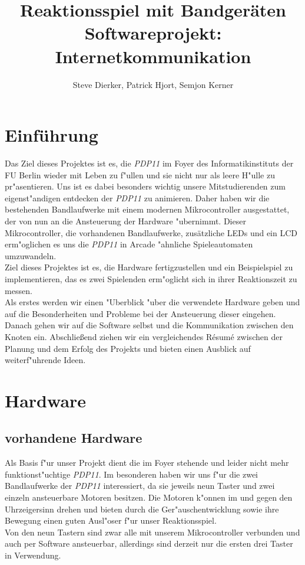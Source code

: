 \documentclass[a4paper]{article}
\title{%
  Reaktionsspiel mit Bandgeräten \\
  \large Softwareprojekt: Internetkommunikation}
\author{Steve Dierker, Patrick Hjort, Semjon Kerner}
\begin{document}
\maketitle

\section{Einführung}
  \label{sec:intro}
  Das Ziel dieses Projektes ist es, die \textit{PDP11} im Foyer des
  Informatikinstituts der FU Berlin wieder mit Leben zu f"ullen und sie nicht
  nur als leere H"ulle zu pr"asentieren. Uns ist es dabei besonders wichtig
  unsere Mitstudierenden zum eigenst"andigen entdecken der \textit{PDP11} zu
  animieren.  Daher haben wir die bestehenden Bandlaufwerke mit einem modernen
  Mikrocontroller ausgestattet, der von nun an die Ansteuerung der Hardware
  "ubernimmt.  Dieser Mikrocontroller, die vorhandenen Bandlaufwerke,
  zusätzliche LEDs und ein LCD erm"oglichen es uns die \textit{PDP11} in Arcade
  "ahnliche Spieleautomaten umzuwandeln.\\ %
  Ziel dieses Projektes ist es, die Hardware fertigzustellen und ein
  Beispielspiel zu implementieren, das es zwei Spielenden erm"oglicht sich in
  ihrer Reaktionszeit zu messen.\\ Als erstes werden wir einen "Uberblick "uber
  die verwendete Hardware geben und auf die Besonderheiten und Probleme bei der
  Ansteuerung dieser eingehen.  Danach gehen wir auf die Software selbst und
  die Kommunikation zwischen den Knoten ein. Abschließend ziehen wir ein
  vergleichendes R\'{e}sum\'{e} zwischen der Planung und dem Erfolg des
  Projekts und bieten einen Ausblick auf weiterf"uhrende Ideen.

\section{Hardware}
  \label{sec:hardware}
  \subsection{vorhandene Hardware}
    \label{sec:hardware_existing}
    Als Basis f"ur unser Projekt dient die im Foyer stehende und leider nicht
    mehr funktionst"uchtige \textit{PDP11}. Im besonderen haben wir uns f"ur
    die zwei Bandlaufwerke der \textit{PDP11} interessiert, da sie jeweils neun
    Taster und zwei einzeln ansteuerbare Motoren besitzen. Die Motoren k"onnen
    im und gegen den Uhrzeigersinn drehen und bieten durch die
    Ger"auschentwicklung sowie ihre Bewegung einen guten Ausl"oser f"ur unser
    Reaktionsspiel.\\ Von den neun Tastern sind zwar alle mit unserem
    Mikrocontroller verbunden und auch per Software ansteuerbar, allerdings
    sind derzeit nur die ersten drei Taster in Verwendung.
\end{document}
